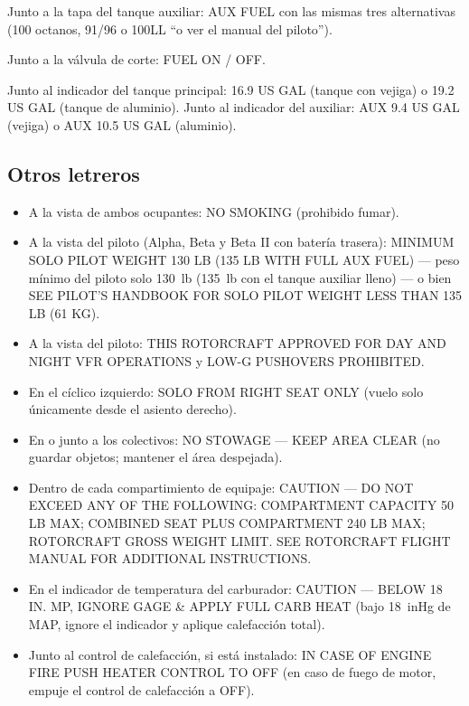 Junto a la tapa del tanque auxiliar: \textsf{AUX FUEL} con las mismas tres alternativas (100 octanos, 91/96 o 100LL ``o ver el manual del piloto'').

Junto a la válvula de corte: \textsf{FUEL ON / OFF}.

Junto al indicador del tanque principal: \textsf{16.9 US GAL} (tanque con vejiga) o \textsf{19.2 US GAL} (tanque de aluminio). Junto al indicador del auxiliar: \textsf{AUX 9.4 US GAL} (vejiga) o \textsf{AUX 10.5 US GAL} (aluminio).

\subsection{Otros letreros}

\begin{itemize}
\item A la vista de ambos ocupantes: \textsf{NO SMOKING} (prohibido fumar).
\item A la vista del piloto (Alpha, Beta y Beta II con batería trasera): \textsf{MINIMUM SOLO PILOT WEIGHT 130 LB (135 LB WITH FULL AUX FUEL)} --- peso mínimo del piloto solo 130~lb (135~lb con el tanque auxiliar lleno) --- o bien \textsf{SEE PILOT'S HANDBOOK FOR SOLO PILOT WEIGHT LESS THAN 135 LB (61 KG)}.
\item A la vista del piloto: \textsf{THIS ROTORCRAFT APPROVED FOR DAY AND NIGHT VFR OPERATIONS} y \textsf{LOW-G PUSHOVERS PROHIBITED}.
\item En el cíclico izquierdo: \textsf{SOLO FROM RIGHT SEAT ONLY} (vuelo solo únicamente desde el asiento derecho).
\item En o junto a los colectivos: \textsf{NO STOWAGE --- KEEP AREA CLEAR} (no guardar objetos; mantener el área despejada).
\item Dentro de cada compartimiento de equipaje: \textsf{CAUTION --- DO NOT EXCEED ANY OF THE FOLLOWING: COMPARTMENT CAPACITY 50 LB MAX; COMBINED SEAT PLUS COMPARTMENT 240 LB MAX; ROTORCRAFT GROSS WEIGHT LIMIT. SEE ROTORCRAFT FLIGHT MANUAL FOR ADDITIONAL INSTRUCTIONS.}
\item En el indicador de temperatura del carburador: \textsf{CAUTION --- BELOW 18 IN. MP, IGNORE GAGE \& APPLY FULL CARB HEAT} (bajo 18~inHg de MAP, ignore el indicador y aplique calefacción total).
\item Junto al control de calefacción, si está instalado: \textsf{IN CASE OF ENGINE FIRE PUSH HEATER CONTROL TO OFF} (en caso de fuego de motor, empuje el control de calefacción a OFF).
\end{itemize}

